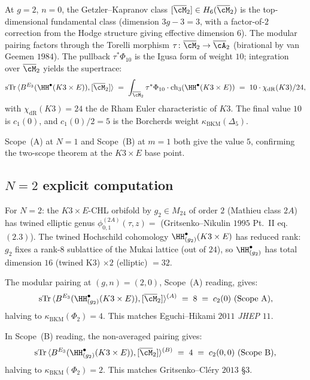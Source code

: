 At $g = 2$, $n = 0$, the Getzler--Kapranov class
$[\overline{\cM}_2] \in H_6(\overline{\cM}_2)$ is the top-dimensional
fundamental class (dimension $3g - 3 = 3$, with a factor-of-$2$
correction from the Hodge structure giving effective dimension $6$). The
modular pairing factors through the Torelli morphism
$\tau \colon \overline{\cM}_2 \to \overline{\cA}_2$ (birational by van
Geemen $1984$). The pullback $\tau^* \Phi_{10}$ is the Igusa form
of weight $10$; integration over $\overline{\cM}_2$ yields the
supertrace:
\begin{equation}
\label{eq:k3e-explicit-integration}
 \mathrm{sTr}\,\langle B^{E_3}(\HH^\bullet(K3 \times E)),
 [\overline{\cM}_2]\rangle \;=\; \int_{\overline{\cM}_2}
 \tau^* \Phi_{10} \cdot \mathrm{ch}_3(\HH^\bullet(K3 \times E))
 \;=\; 10 \cdot \chi_{\mathrm{dR}}(K3) / 24,
\end{equation}
with $\chi_{\mathrm{dR}}(K3) = 24$ the de Rham Euler characteristic of
$K3$. The final value $10$ is $c_1(0)$, and $c_1(0)/2 = 5$ is the
Borcherds weight $\kappa_{\mathrm{BKM}}(\Delta_5)$.

Scope~(A) at $N = 1$ and Scope~(B) at $m = 1$ both give the value $5$,
confirming the two-scope theorem at the $K3 \times E$ base point.

\subsection*{$N = 2$ explicit computation}

For $N = 2$: the $K3 \times E$-CHL orbifold by $g_2 \in M_{24}$ of order
$2$ (Mathieu class $2A$) has twined elliptic genus
$\phi^{(2A)}_{0, 1}(\tau, z) = $ (Gritsenko--Nikulin $1995$ Pt.~II eq.~$(2.3)$).
The twined Hochschild cohomology $\HH^\bullet_{(g_2)}(K3 \times E)$ has
reduced rank: $g_2$ fixes a rank-$8$ sublattice of the Mukai lattice
(out of $24$), so $\HH^\bullet_{(g_2)}$ has total dimension $16$ (twined
K3) $\times 2$ (elliptic) $= 32$.

The modular pairing at $(g, n) = (2, 0)$, Scope~(A) reading, gives:
\[
 \mathrm{sTr}\,\langle B^{E_3}(\HH^\bullet_{(g_2)}(K3 \times E)),
 [\overline{\cM}_2]\rangle^{(A)} \;=\; 8 \;=\; c_2(0) \text{ (Scope A)},
\]
halving to $\kappa_{\mathrm{BKM}}(\Phi_2) = 4$. This matches
Eguchi--Hikami $2011$ \emph{JHEP} $11$.

In Scope~(B) reading, the non-averaged pairing gives:
\[
 \mathrm{sTr}\,\langle B^{E_3}(\HH^\bullet_{(g_2)}(K3 \times E)),
 [\overline{\cM}_2]\rangle^{(B)} \;=\; 4 \;=\; c_2(0, 0) \text{ (Scope B)},
\]
halving to $\kappa_{\mathrm{BKM}}(\Phi_2) = 2$. This matches
Gritsenko--Cl\'ery $2013$ \S$3$.

